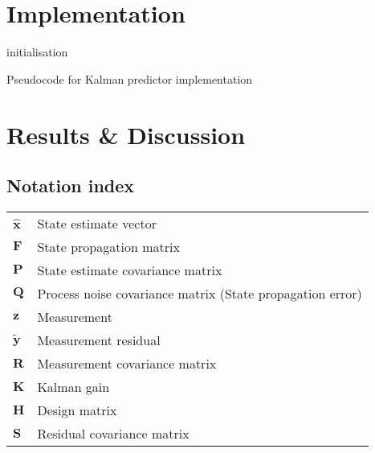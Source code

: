\documentclass[12pt]{article}
\begin{document}
\section{Implementation}

\begin{algorithm}[H]
 initialisation\;

 \caption{Pseudocode for Kalman predictor implementation}
\end{algorithm}

\section{Results \& Discussion}

\newpage
\begin{appendices}

\section{Notation index}
\begin{tabular}{ll}
$\hat{\mathbf{x}}$   & State estimate vector \\
$\mathbf{F}$         & State propagation matrix \\
$\mathbf{P}$         & State estimate covariance matrix \\
$\mathbf{Q}$         & Process noise covariance matrix (State propagation error) \\
$\mathbf{z}$         & Measurement \\
$\tilde{\mathbf{y}}$ & Measurement residual \\
$\mathbf{R}$         & Measurement covariance matrix \\
$\mathbf{K}$         & Kalman gain \\
$\mathbf{H}$         & Design matrix \\
$\mathbf{S}$         & Residual covariance matrix \\
\end{tabular}

\end{appendices}
\end{document}
